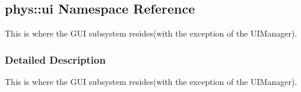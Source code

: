 \hypertarget{namespacephys_1_1ui}{
\subsection{phys::ui Namespace Reference}
\label{namespacephys_1_1ui}
}


This is where the GUI subsystem resides(with the exception of the UIManager).  




\subsubsection{Detailed Description}
This is where the GUI subsystem resides(with the exception of the UIManager). 
